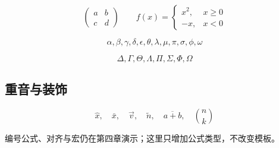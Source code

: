 \documentclass{article}
\begin{document}
\[
\left( \begin{matrix} a & b \\ c & d \end{matrix} \right)
\qquad
f(x) = \begin{cases} x^2, & x \ge 0 \\ -x, & x < 0 \end{cases}
\]

\[
\alpha, \beta, \gamma, \delta, \epsilon, \theta, \lambda, \mu, \pi, \sigma, \phi, \omega
\]

\[
\Delta, \Gamma, \Theta, \Lambda, \Pi, \Sigma, \Phi, \Omega
\]

\subsection{重音与装饰}

\[
\hat{x}, \quad \bar{x}, \quad \vec{v}, \quad \tilde{n}, \quad \overline{a+b}, \quad \binom{n}{k}
\]

编号公式、对齐与宏仍在第四章演示；这里只增加公式类型，不改变模板。
\end{document}
